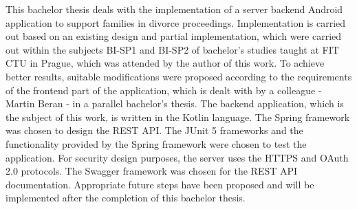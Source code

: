This bachelor thesis deals with the implementation of a server backend Android application to support families in divorce proceedings. Implementation is carried out based on an existing design and partial implementation, which were carried out within the subjects BI-SP1 and BI-SP2 of bachelor's studies taught at FIT CTU in Prague, which was attended by the author of this work. To achieve better results, suitable modifications were proposed according to the requirements of the frontend part of the application, which is dealt with by a colleague - Martin Beran - in a parallel bachelor's thesis. The backend application, which is the subject of this work, is written in the Kotlin language. The Spring framework was chosen to design the REST API. The JUnit 5 frameworks and the functionality provided by the Spring framework were chosen to test the application. For security design purposes, the server uses the HTTPS and OAuth 2.0 protocols. The Swagger framework was chosen for the REST API documentation. Appropriate future steps have been proposed and will be implemented after the completion of this bachelor thesis.